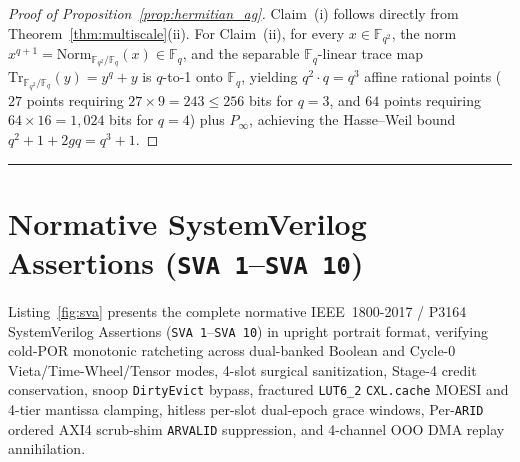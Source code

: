 \documentclass[10pt,twocolumn]{article}
\makeatletter
\newif\ifspecintwocol \specintwocolfalse
\newif\ifspecresume   \specresumefalse
\newcommand{\StartTwoCol}{%
  \if@twocolumn
    \let\spec@next\@empty
  \else
    \ifspecintwocol
      \let\spec@next\@empty
    \else
      \global\specintwocoltrue
      \def\spec@next{\begin{multicols}{2}}%
    \fi
  \fi
  \spec@next
}
\newcommand{\EndConnesPlate}{%
  \par\vspace{3pt}\noindent\textcolor{black!25}{\rule{\textwidth}{0.4pt}}\par\vspace{4pt}%
  \ifspecresume
    \global\specresumefalse
    \let\spec@platepost\StartTwoCol
  \else
    \let\spec@platepost\@empty
  \fi
  \spec@platepost
}
\theoremstyle{spectralthm}
\makeatother
\begin{document}
\begin{proof}[Proof of Proposition~\ref{prop:hermitian_ag}]
Claim~(i) follows directly from Theorem~\ref{thm:multiscale}(ii). For Claim~(ii), for every $x \in \mathbb{F}_{q^2}$, the norm $x^{q+1} = \mathrm{Norm}_{\mathbb{F}_{q^2}/\mathbb{F}_q}(x) \in \mathbb{F}_q$, and the separable $\mathbb{F}_q$-linear trace map $\mathrm{Tr}_{\mathbb{F}_{q^2}/\mathbb{F}_q}(y) = y^q + y$ is $q$-to-1 onto $\mathbb{F}_q$, yielding $q^2 \cdot q = q^3$ affine rational points ($27$ points requiring $27 \times 9 = 243 \le 256$ bits for $q=3$, and $64$ points requiring $64 \times 16 = 1,024$ bits for $q=4$) plus $P_\infty$, achieving the Hasse--Weil bound $q^2 + 1 + 2g q = q^3 + 1$.
\end{proof}
\EndConnesPlate

\section{Normative SystemVerilog Assertions (\texorpdfstring{\texttt{SVA 1}--\texttt{SVA 10}}{SVA 1--SVA 10})}
\label{app:sva}

Listing~\ref{fig:sva} presents the complete normative IEEE~1800-2017 / P3164 SystemVerilog Assertions (\texttt{SVA 1}--\texttt{SVA 10}) in upright portrait format, verifying cold-POR monotonic ratcheting across dual-banked Boolean and Cycle-0 Vieta/Time-Wheel/Tensor modes, 4-slot surgical sanitization, Stage-4 credit conservation, snoop \texttt{DirtyEvict} bypass, fractured \mbox{\texttt{LUT6\_2}} \texttt{CXL.cache} MOESI and 4-tier mantissa clamping, hitless per-slot dual-epoch grace windows, Per-\texttt{ARID} ordered AXI4 scrub-shim \texttt{ARVALID} suppression, and 4-channel OOO DMA replay annihilation.
\end{document}
